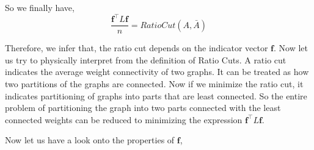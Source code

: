 \documentclass[english]{article}
\theoremstyle{plain}
\begin{document}
So we finally have,
\begin{equation}
\frac{\boldsymbol{f}^{\top}L\boldsymbol{f}}{n} = Ratio Cut(A,\bar{A})
\end{equation}

Therefore, we infer that, the ratio cut depends on the indicator vector $\boldsymbol{f}$. Now let us try to physically interpret from the definition of Ratio Cuts. A ratio cut indicates the average weight connectivity of two graphs. It can be treated as how two partitions of the graphs are connected. Now if we minimize the ratio cut, it indicates partitioning of graphs into parts that are least connected. So the entire problem of partitioning the graph into two parts connected with the least connected weights can be reduced to minimizing the expression $\boldsymbol{f}^{\top}L\boldsymbol{f}$.

Now let us have a look onto the properties of $\boldsymbol{f}$,
\end{document}
